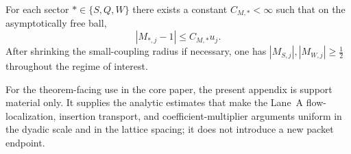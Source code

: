 \begin{proposition}
For each sector $\ast\in\{S,Q,W\}$ there exists a constant $C_{M,\ast}<\infty$ such that on the asymptotically free ball,
\[
|M_{\ast,j}-1|\le C_{M,\ast}u_j.
\]
After shrinking the small-coupling radius if necessary, one has $|M_{S,j}|,|M_{W,j}|\ge \tfrac12$ throughout the regime of interest.
\end{proposition}


\begin{remark}
For the theorem-facing use in the core paper, the present appendix is support material only. It supplies the analytic estimates that make the Lane~A flow-localization, insertion transport, and coefficient-multiplier arguments uniform in the dyadic scale and in the lattice spacing; it does not introduce a new packet endpoint.
\end{remark}

